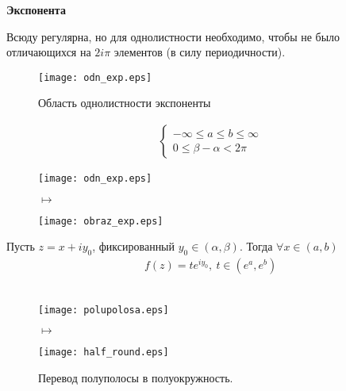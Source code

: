 \begin{center}
    \textbf{Экспонента}
\end{center}
Всюду регулярна, но для однолистности необходимо, чтобы не было отличающихся на
$2 i \pi$ элементов (в силу периодичности).
\begin{figure}[h!]
    \centering
    \texttt{[image: odn\_exp.eps]}
    \label{fig:24.4}
    \caption{Область однолистности экспоненты}
\end{figure}
\begin{align*}
  & \begin{cases}
      -\infty \leq a \leq b \leq \infty \\
      0 \leq \beta - \alpha < 2 \pi
  \end{cases}
\end{align*}
\Example
\begin{figure}[h!]
    \begin{minipage}[c]{0.45\textwidth}
        \centering
        \texttt{[image: odn\_exp.eps]}
    \end{minipage}
    \begin{minipage}[c]{0.1\textwidth}
        \centering
        \LARGE{$\mapsto$}
    \end{minipage}
    \begin{minipage}[c]{0.45\textwidth}
        \centering
        \texttt{[image: obraz\_exp.eps]}
    \end{minipage}
    \label{fig:24.5}
\end{figure}
Пусть $z = x+iy_0$, фиксированный $y_0 \in (\alpha,\beta)$. Тогда $\forall x \in
(a,b)$
\begin{align*}
  & f(z) = te^{iy_0}, \ t \in \left( e^{a}, e^{b} \right)
\end{align*}
\Example
~
\\
\begin{figure}[h!]
    \begin{minipage}[c]{0.45\textwidth}
        \centering
        \texttt{[image: polupolosa.eps]}
    \end{minipage}
    \begin{minipage}[c]{0.1\textwidth}
        \centering
        \LARGE{$\mapsto$}
    \end{minipage}
    \begin{minipage}[c]{0.45\textwidth}
        \centering
        \texttt{[image: half\_round.eps]}
    \end{minipage}
    \label{fig:24.6}
    \caption{Перевод полуполосы в полуокружность.}
\end{figure}

